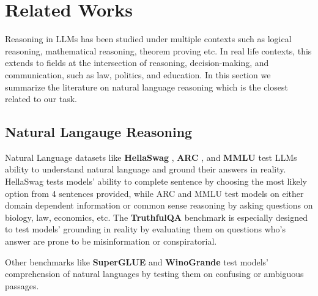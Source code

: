 \section{Related Works}
\label{related}
Reasoning in LLMs has been studied under multiple contexts such as logical reasoning, mathematical reasoning, theorem proving etc. In real life contexts, this extends to fields at the intersection of reasoning, decision-making, and communication, such as law, politics, and education. In this section we summarize the literature on natural language reasoning which is the closest related to our task.

\subsection{Natural Langauge Reasoning}
Natural Language datasets like \textbf{HellaSwag} \citep{zellers2019hellaswagmachinereallyfinish},  \textbf{ARC} \citep{clark2018thinksolvedquestionanswering}, and \textbf{MMLU} \cite{hendrycks2021measuringmassivemultitasklanguage} test LLMs ability to understand natural language and ground their answers in reality. HellaSwag tests models' ability to complete sentence by choosing the most likely option from 4 sentences provided, while ARC and MMLU test models on either domain dependent information or common sense reasoning by asking questions on biology, law, economics, etc. The \textbf{TruthfulQA} \citep{lin2022truthfulqameasuringmodelsmimic} benchmark is especially designed to test models' grounding in reality by evaluating them on questions who's answer are prone to be misinformation or conspiratorial. 

Other benchmarks like \textbf{SuperGLUE} \citep{wang2020supergluestickierbenchmarkgeneralpurpose} and \textbf{WinoGrande} \citep{sakaguchi2019winograndeadversarialwinogradschema} test models' comprehension of natural languages by testing them on confusing or ambiguous passages.

